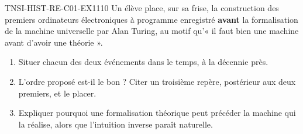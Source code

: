 

\begin{exercice}{TNSI-HIST-RE-C01-EX1}{1}{10}
Un élève place, sur sa frise, la construction des premiers ordinateurs électroniques à
programme enregistré \textbf{avant} la formalisation de la machine universelle
par Alan Turing, au motif qu'« il faut bien une machine avant d'avoir une
théorie ».
\begin{enumerate}
  \item Situer chacun des deux événements dans le temps, à la décennie près.
  \item L'ordre proposé est-il le bon ? Citer un troisième repère, postérieur
    aux deux premiers, et le placer.
  \item Expliquer pourquoi une formalisation théorique peut précéder la machine
    qui la réalise, alors que l'intuition inverse paraît naturelle.
\end{enumerate}
\end{exercice}


